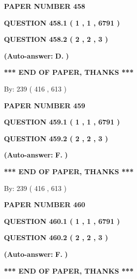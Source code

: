 \documentclass[12pt]{article}
\begin{document}
   
 {\textbf{ \Large{ PAPER NUMBER  458  }}}
   
   
   
   
  
  
{\textbf{\large{QUESTION
458.1 
 ( 1 , 1 , 6791 )
}}}
  
  
{\textbf{\large{QUESTION
458.2 
 ( 2 , 2 , 3 )
}}}
 
 
{\textbf{(Auto-answer:}}
{\textbf{\large{
D.}}}
{\textbf{)}}
 
 
   
   
   
   
\vspace{1.0in} 
{\textbf{\large{ *** END OF PAPER, THANKS *** }}} 
   
   
\hspace{1.0in} By: 
 239 ( 416 ,  613 )
   
   
   
   
\newpage 
\setcounter{page}{ 
   459001 } 
   
   
 {\textbf{ \Large{ PAPER NUMBER  459  }}}
   
   
   
   
  
  
{\textbf{\large{QUESTION
459.1 
 ( 1 , 1 , 6791 )
}}}
  
  
{\textbf{\large{QUESTION
459.2 
 ( 2 , 2 , 3 )
}}}
 
 
{\textbf{(Auto-answer:}}
{\textbf{\large{
F.}}}
{\textbf{)}}
 
 
   
   
   
   
\vspace{1.0in} 
{\textbf{\large{ *** END OF PAPER, THANKS *** }}} 
   
   
\hspace{1.0in} By: 
 239 ( 416 ,  613 )
   
   
   
   
\newpage 
\setcounter{page}{ 
   460001 } 
   
   
 {\textbf{ \Large{ PAPER NUMBER  460  }}}
   
   
   
   
  
  
{\textbf{\large{QUESTION
460.1 
 ( 1 , 1 , 6791 )
}}}
  
  
{\textbf{\large{QUESTION
460.2 
 ( 2 , 2 , 3 )
}}}
 
 
{\textbf{(Auto-answer:}}
{\textbf{\large{
F.}}}
{\textbf{)}}
 
 
   
   
   
   
\vspace{1.0in} 
{\textbf{\large{ *** END OF PAPER, THANKS *** }}} 
   
\end{document}
